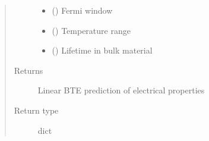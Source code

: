 \documentclass[letterpaper,10pt,english]{sphinxmanual}
\begin{document}
\begin{fulllineitems}
\begin{quote}
\begin{description}
\begin{itemize}
\item {} 
\sphinxAtStartPar
{} () \textendash{} Fermi window

\item {} 
\sphinxAtStartPar
{} () \textendash{} Temperature range

\item {} 
\sphinxAtStartPar
{} () \textendash{} Lifetime in bulk material

\end{itemize}

\item[{Returns}] \leavevmode
\sphinxAtStartPar
{} \textendash{} Linear BTE prediction of electrical properties

\item[{Return type}] \leavevmode
\sphinxAtStartPar
dict

\end{description}\end{quote}

\end{fulllineitems}




\renewcommand{\indexname}{Index}
\printindex
\end{document}
